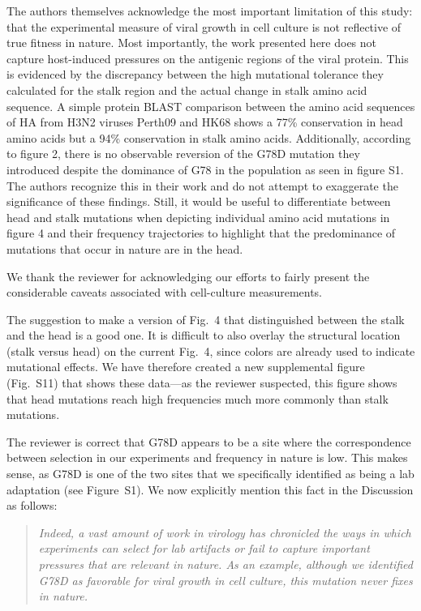 \documentclass[11pt, oneside]{article}   	%
\newcommand{\response}[1]{{\color{black}#1}}
\begin{document}
The authors themselves acknowledge the most important limitation of this study: that the experimental measure of viral growth in cell culture is not reflective of true fitness in nature. Most importantly, the work presented here does not capture host-induced pressures on the antigenic regions of the viral protein. This is evidenced by the discrepancy between the high mutational tolerance they calculated for the stalk region and the actual change in stalk amino acid sequence. A simple protein BLAST comparison between the amino acid sequences of HA from H3N2 viruses Perth09 and HK68 shows a 77\% conservation in head amino acids but a 94\% conservation in stalk amino acids. Additionally, according to figure 2, there is no observable reversion of the G78D mutation they introduced despite the dominance of G78 in the population as seen in figure S1. The authors recognize this in their work and do not attempt to exaggerate the significance of these findings. Still, it would be useful to differentiate between head and stalk mutations when depicting individual amino acid mutations in figure 4 and their frequency trajectories to highlight that the predominance of mutations that occur in nature are in the head. 

\response{We thank the reviewer for acknowledging our efforts to fairly present the considerable caveats associated with cell-culture measurements.

The suggestion to make a version of Fig.~4 that distinguished between the stalk and the head is a good one.
It is difficult to also overlay the structural location (stalk versus head) on the current Fig.~4, since colors are already used to indicate mutational effects.
We have therefore created a new supplemental figure (Fig.~S11) that shows these data---as the reviewer suspected, this figure shows that head mutations reach high frequencies much more commonly than stalk mutations.

The reviewer is correct that G78D appears to be a site where the correspondence between selection in our experiments and frequency in nature is low.
This makes sense, as G78D is one of the two sites that we specifically identified as being a lab adaptation (see Figure~S1).
We now explicitly mention this fact in the Discussion as follows:

\begin{quote}
\textsl{Indeed, a vast amount of work in virology has chronicled the ways in which experiments can select for lab artifacts or fail to capture important pressures that are relevant in nature.
As an example, although we identified G78D as favorable for viral growth in cell culture, this mutation never fixes in nature. }
\end{quote}
} 
\end{document}
